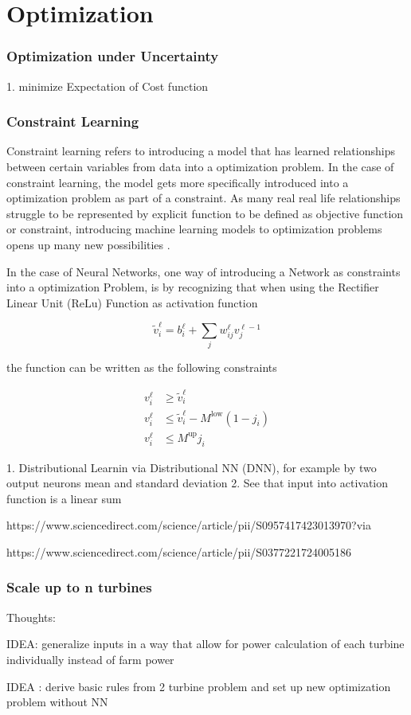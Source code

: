 
\chapter{Optimization}\label{chapter:optimization}

\subsection{Optimization under Uncertainty}
1. minimize Expectation of Cost function 


\subsection{Constraint Learning}

Constraint learning refers to introducing a model that has learned relationships between certain variables from data into a optimization problem. In the case of constraint learning, the model gets more specifically introduced into a optimization problem as part of a constraint. As many real real life relationships struggle to be represented by explicit function to be defined as objective function or constraint, introducing machine learning models to optimization problems opens up many new possibilities \cite{FAJEMISIN20241}.

In the case of Neural Networks, one way of introducing a Network as constraints into a optimization Problem, is by recognizing that when using the Rectifier Linear Unit (ReLu) Function as activation function 

\begin{equation}
	\tilde{v}_i^\ell = b_i^\ell + \sum_j w_{ij}^\ell v_j^{\ell - 1}
\end{equation}


the function can be written as the following constraints 

\begin{align}
	v_i^\ell &\geq \tilde{v}_i^\ell \\
	v_i^\ell &\leq \tilde{v}_i^\ell - M^{\text{low}}(1 - j_i) \\
	v_i^\ell &\leq M^{\text{up}} j_i
\end{align}



1. Distributional Learnin via Distributional NN (DNN), for example by two output neurons mean and standard deviation
2. See that input into activation function is a linear sum


https://www.sciencedirect.com/science/article/pii/S0957417423013970?via%

https://www.sciencedirect.com/science/article/pii/S0377221724005186


\subsection{Scale up to n turbines}

Thoughts: 

IDEA: generalize inputs in a way that allow for power calculation of each turbine individually instead of farm power

IDEA : derive basic rules from 2 turbine problem and set up new optimization problem without NN 

